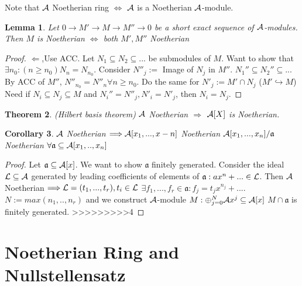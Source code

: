 \documentclass[11pt]{article}
\newtheorem{thm}{Theorem}[section]
\newtheorem{lemma}[thm]{Lemma}
\newtheorem{cor}[thm]{Corollary}
\newcommand{\sca}{{\mathfrak a}}
\newcommand{\cala}{{\cal A}}
\newcommand{\call}{{\cal L}}
\newcommand{\Lrta}{\Longrightarrow}
\newcommand{\lrta}{\longrightarrow}
\newcommand{\Llta}{\Longleftarrow}
\newcommand{\Llrta}{\Longleftrightarrow}
\newcommand{\inj}{\hookrightarrow}
\begin{document}
Note that $\cala$ Noetherian ring $\Llrta $ $\cala$ is a Noetherian $\cala$-module.

\begin{lemma}
Let $0\lrta M'\lrta M\lrta M''\lrta 0$ be a short exact sequence of $\cala$-modules. Then $M$ is Noetherian $\Llrta $ both $M', M''$ Noetherian
\end{lemma}
\begin{proof}
$\Llta$,Use ACC. Let $N_1\subseteq N_2\subseteq ...$ be submodules of $M$. Want to show that $\exists n_0 :(n\geq n_0) N_n=N_{n_0}$.
Consider $N''_j:=$ Image of $N_j$ in $M''$. $ N_1''\subseteq N_2''\subseteq ...$ By ACC of $M''$, $N''_{n_0}=N''_{n}\forall n\geq n_0$. Do the same for $N'_j:=M'\cap N_j$ ($M'\inj M$)\\
Need if $N_i\subseteq N_j\subseteq M$ and $N_i''=N''_j, N'_i=N'_j$, then $N_i=N_j$.
\end{proof}

\begin{thm}(Hilbert basis theorem)
$\cala$ Noetherian $\Lrta $ $\cala[X]$ is Noetherian.
\end{thm}

\begin{cor}
$\cala$ Noetherian $\Lrta \cala[x_1,...,x-n]$ Noetherian $\cala[x_1,...,x_n]/\sca$ Noetherian $\forall \sca\subseteq \cala[x_1,..,x_n]$
\end{cor}

\begin{proof}
Let $\sca\subseteq \cala[x]$. We want to show $\sca$ finitely generated. Consider the ideal $\call\subseteq \cala$ generated by leading coefficients of elements of $\sca:ax^n+...\in \call$.
Then $\cala$ Noetherian $\Lrta\call=(t_1,...,t_r),t_i\in \call$ $\exists f_1,...,f_r\in \sca: f_j=t_j x^{n_j}+...$. $N:=max(n_1,..,n_r)$ and we construct $\cala$-module $M:\oplus^N_{j=0}\cala x^j\subseteq \cala[x]$ $M\cap \sca$ is finitely generated.
>>>>>>>>>4
\end{proof}

\section{Noetherian Ring and Nullstellensatz}
\end{document}
